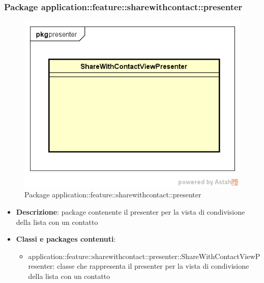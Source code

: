 \subsubsection{Package application::feature::sharewithcontact::presenter}
\label{Package application::feature::sharewithcontact::presenter}
\begin{figure}[H]
	\centering
	\includegraphics[scale=0.5]{Sezioni/Packages/Application/share_with_contact_presenter.png}
	\caption{Package application::feature::sharewithcontact::presenter}
\end{figure}
\begin{itemize}
	\item \textbf{Descrizione}: package contenente il presenter per la vista di condivisione della lista con un contatto
	\item \textbf{Classi e packages contenuti}:
	\begin{itemize}
	\item application::feature::sharewithcontact::presenter::ShareWithContactViewPresenter: classe che rappresenta il presenter per la vista di condivisione della lista con un contatto
	\end{itemize}
\end{itemize}


